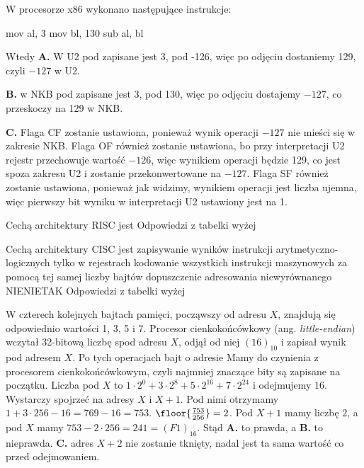\begin{solutions}
    \sol W procesorze x86 wykonano następujące instrukcje:
    \begin{gas}
        mov al, 3
        mov bl, 130
        sub al, bl
    \end{gas}
    Wtedy
    \textbf{A.} W U2 pod  zapisane jest 3, pod  -126, więc po odjęciu dostaniemy 129, czyli $-127$ w U2.

    \textbf{B.} w NKB pod  zapisane jest 3, pod  130, więc po odjęciu dostajemy $-127$, co przeskoczy na 129 w NKB.

    \textbf{C.} Flaga CF zostanie ustawiona, ponieważ wynik operacji $-127$ nie mieści się w zakresie NKB. Flaga OF również zostanie ustawiona, bo przy interpretacji U2 rejestr  przechowuje wartość $-126$, więc wynikiem operacji będzie 129, co jest spoza zakresu U2 i zostanie przekonwertowane na $-127$. Flaga SF również zostanie ustawiona, ponieważ jak widzimy, wynikiem operacji jest liczba ujemna, więc pierwszy bit wyniku w interpretacji U2 ustawiony jest na 1.

    \sol Cechą architektury RISC jest
    Odpowiedzi z tabelki wyżej

    \sol Cechą architektury CISC jest
    \answerss
    {zapisywanie wyników instrukcji arytmetyczno-logicznych tylko w rejestrach}
    {kodowanie wszystkich instrukcji maszynowych za pomocą tej samej liczby bajtów}
    {dopuszczenie adresowania niewyrównanego}
    {NIE}{NIE}{TAK}
    Odpowiedzi z tabelki wyżej

    \sol W czterech kolejnych bajtach pamięci, począwszy od adresu $X$, znajdują się odpowiednio wartości 1, 3, 5 i 7. Procesor cienkokońcówkowy (ang. \textit{little-endian}) wczytał 32-bitową liczbę spod adresu $X$, odjął od niej $(16)_{10}$ i zapisał wynik pod adresem $X$. Po tych operacjach bajt o adresie
    Mamy do czynienia z procesorem cienkokońcówkowym, czyli najmniej znaczące bity są zapisane na początku. Liczba pod $X$ to $1\cdot 2^0 + 3 \cdot 2^8 + 5\cdot 2^{16} + 7\cdot 2^{24}$ i odejmujemy $16$. Wystarczy spojrzeć na adresy $X$ i $X+1$. Pod nimi otrzymamy $1 + 3\cdot 256 - 16= 769-16=753$. $\floor{\frac{753}{256}}=2$. Pod $X+1$ mamy liczbę $2$, a pod $X$ mamy $753-2\cdot 256=241 = (F1)_{16}$. Stąd \textbf{A.} to prawda, a \textbf{B.} to nieprawda.
    \textbf{C.} adres $X+2$ nie zostanie tknięty, nadal jest ta sama wartość co przed odejmowaniem.


\end{solutions}
